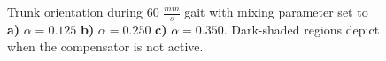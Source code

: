 \begin{figure}[t!]
	\centering
	\begin{subfigure}{0.475\textwidth}
		\centering
		\caption{ }
	\end{subfigure}
	\begin{subfigure}{0.475\textwidth}
		\centering
		\caption{ }
	\end{subfigure}
	\begin{subfigure}{0.475\textwidth}
		\centering
		\caption{ }
	\end{subfigure}
	\caption{ Trunk orientation during 60 $\frac{mm}{s}$ gait with mixing parameter set to
		 \textbf{a)}  $\alpha = 0.125$ 
		 \textbf{b)}  $\alpha = 0.250$ 
		 \textbf{c)}  $\alpha = 0.350$.
		Dark-shaded regions depict when the compensator is not active.
	}
	\label{fig::alpha_tests}
\end{figure}



